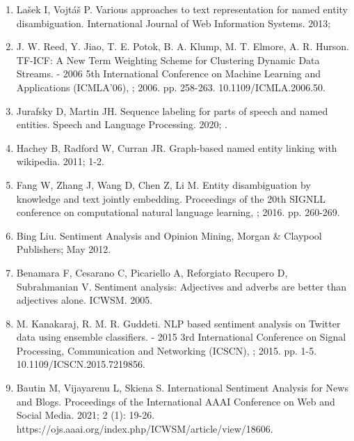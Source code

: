 \begin{enumerate}
   \item \hypertarget{11}{Lašek I, Vojtáš P. Various approaches to text representation for named entity disambiguation. International Journal of Web Information Systems. 2013;}


    \item \hypertarget{12}{J. W. Reed, Y. Jiao, T. E. Potok, B. A. Klump, M. T. Elmore, A. R. Hurson. TF-ICF: A New Term Weighting Scheme for Clustering Dynamic Data Streams. - 2006 5th International Conference on Machine Learning and Applications (ICMLA'06), ; 2006. pp. 258-263. 10.1109/ICMLA.2006.50.}

     \item \hypertarget{13}{Jurafsky D, Martin JH. Sequence labeling for parts of speech and named entities. Speech and Language Processing. 2020; .}
     
     \item \hypertarget{14}{Hachey B, Radford W, Curran JR. Graph-based named entity linking with wikipedia. 2011; 1-2.}
     
    \item \hypertarget{15}{Fang W, Zhang J, Wang D, Chen Z, Li M. Entity disambiguation by knowledge and text jointly embedding. Proceedings of the 20th SIGNLL conference on computational natural language learning, ; 2016. pp. 260-269.}
     
    \item \hypertarget{16}{Bing Liu. Sentiment Analysis and Opinion Mining, Morgan \&
Claypool Publishers; May 2012. }

    \item \hypertarget{17}{Benamara F, Cesarano C, Picariello A, Reforgiato Recupero D, Subrahmanian V. Sentiment analysis: Adjectives and adverbs are better than adjectives alone. ICWSM. 2005. }
     
     \item \hypertarget{18}{M. Kanakaraj, R. M. R. Guddeti. NLP based sentiment analysis on Twitter data using ensemble classifiers. - 2015 3rd International Conference on Signal Processing, Communication and Networking (ICSCN), ; 2015. pp. 1-5. 10.1109/ICSCN.2015.7219856. }
    
    \item \hypertarget{19}{Bautin M, Vijayarenu L, Skiena S. International Sentiment Analysis for News and Blogs. Proceedings of the International AAAI Conference on Web and Social Media. 2021; 2 (1): 19-26. https://ojs.aaai.org/index.php/ICWSM/article/view/18606.}
     

\end{enumerate}
